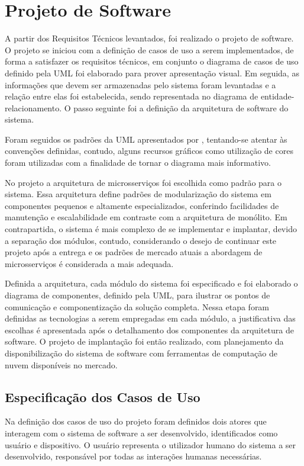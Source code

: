\section{Projeto de Software}

A partir dos Requisitos Técnicos levantados, foi realizado o projeto de software. O projeto se iniciou com a definição de casos de uso a serem implementados, de forma a satisfazer os requisitos técnicos, em conjunto o diagrama de casos de uso definido pela UML foi elaborado para prover apresentação visual. Em seguida, as informações que devem ser armazenadas pelo sistema foram levantadas e a relação entre elas foi estabelecida, sendo representada no diagrama de entidade-relacionamento. O passo seguinte foi a definição da arquitetura de software do sistema.


Foram seguidos os padrões da UML apresentados por , tentando-se atentar às convenções definidas, contudo, alguns recursos gráficos como utilização de cores foram utilizadas com a finalidade de tornar o diagrama mais informativo.


No projeto a arquitetura de microsserviços foi escolhida como padrão para o sistema. Essa arquitetura define padrões de modularização do sistema em componentes pequenos e altamente especializados, conferindo facilidades de manutenção e escalabilidade em contraste com a arquitetura de monólito. Em contrapartida, o sistema é mais complexo de se implementar e implantar, devido a separação dos módulos, contudo, considerando o desejo de continuar este projeto após a entrega e os padrões de mercado atuais a abordagem de microsserviços é considerada a mais adequada. 


Definida a arquitetura, cada módulo do sistema foi especificado e foi elaborado o diagrama de componentes, definido pela UML, para ilustrar os pontos de comunicação e componentização da solução completa. Nessa etapa foram definidas as tecnologias a serem empregadas em cada módulo, a justificativa das escolhas é apresentada após o detalhamento dos componentes da arquitetura de software. O projeto de implantação foi então realizado, com planejamento da disponibilização do sistema de software com ferramentas de computação de nuvem disponíveis no mercado.

\subsection{Especificação dos Casos de Uso}

Na definição dos casos de uso do projeto foram definidos dois atores que interagem com o sistema de software a ser desenvolvido, identificados como 
usuário e dispositivo. O usuário representa o utilizador humano do sistema a ser desenvolvido, responsável por todas as interações humanas necessárias. 

